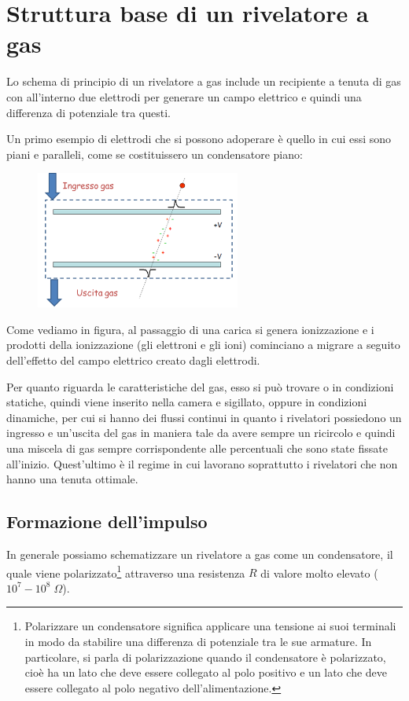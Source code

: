 \newpage

\section{Struttura base di un rivelatore a gas}
Lo schema di principio di un rivelatore a gas include un recipiente a tenuta di gas con all'interno due
elettrodi per generare un campo elettrico e quindi una differenza di potenziale tra questi.

Un primo esempio di elettrodi che si possono adoperare è quello in cui essi sono piani e paralleli, come se costituissero un condensatore piano:

\begin{figure}[H]
   \centering
   \includegraphics[width=0.6\textwidth]{immagini/modello_riv_gas_condensatore.png}
\end{figure}

Come vediamo in figura, al passaggio di una carica si genera ionizzazione e i prodotti della ionizzazione (gli elettroni e gli ioni) cominciano a migrare a seguito dell'effetto del campo elettrico creato dagli elettrodi.

Per quanto riguarda le caratteristiche del gas, esso si può trovare o in condizioni statiche, quindi viene inserito nella camera e sigillato, oppure in condizioni dinamiche, per cui si hanno dei flussi continui in quanto i rivelatori possiedono un ingresso e un'uscita del gas in maniera tale da avere sempre un ricircolo e quindi una miscela di gas sempre corrispondente alle percentuali che sono state fissate all'inizio. Quest'ultimo è il regime in cui lavorano soprattutto i rivelatori che non hanno una tenuta ottimale.

\subsection{Formazione dell'impulso}
In generale possiamo schematizzare un rivelatore a gas come un condensatore, il quale viene polarizzato\footnote{Polarizzare un condensatore significa applicare una tensione ai suoi terminali in modo da stabilire una differenza di potenziale tra le sue armature. In particolare, si parla di polarizzazione quando il condensatore è polarizzato, cioè ha un lato che deve essere collegato al polo positivo e un lato che deve essere collegato al polo negativo dell'alimentazione.} attraverso una resistenza $R$ di valore molto elevato ($10^7-10^8 \; \Omega$).

